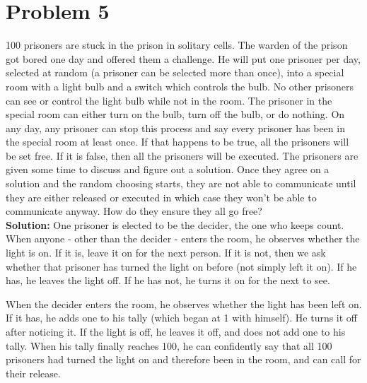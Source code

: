 \documentclass{article}
\providecommand{\soln}{\textbf{Solution: }}
\begin{document}
    \section*{Problem 5}
    100 prisoners are stuck in the prison in solitary cells. The warden of the prison
    got bored one day and offered them a challenge. He will put one prisoner per day,
    selected at random (a prisoner can be selected more than once), into a special
    room with a light bulb and a switch which controls the bulb. No other prisoners
    can see or control the light bulb while not in the room. The prisoner in the special
    room can either turn on the bulb, turn off the bulb, or do nothing. On any day, any prisoner can stop this process and say every prisoner has been in the special
    room at least once. If that happens to be true, all the prisoners will be set free.
    If it is false, then all the prisoners will be executed. The prisoners are given some
    time to discuss and figure out a solution. Once they agree on a solution and the
    random choosing starts, they are not able to communicate until they are either
    released or executed in which case they won't be able to communicate anyway.
    How do they ensure they all go free?\\
    
    \soln One prisoner is elected to be the decider, the one who keeps count. When anyone - other than the decider - enters the room, he observes whether the light is on. If it is, leave it on for the next person. If it is not, then we ask whether that prisoner has turned the light on before (not simply left it on). If he has, he leaves the light off. If he has not, he turns it on for the next to see.
    
    When the decider enters the room, he observes whether the light has been left on. If it has, he adds one to his tally (which began at 1 with himself). He turns it off after noticing it. If the light is off, he leaves it off, and does not add one to his tally. When his tally finally reaches 100, he can confidently say that all 100 prisoners had turned the light on and therefore been in the room, and can call for their release.
\end{document}
